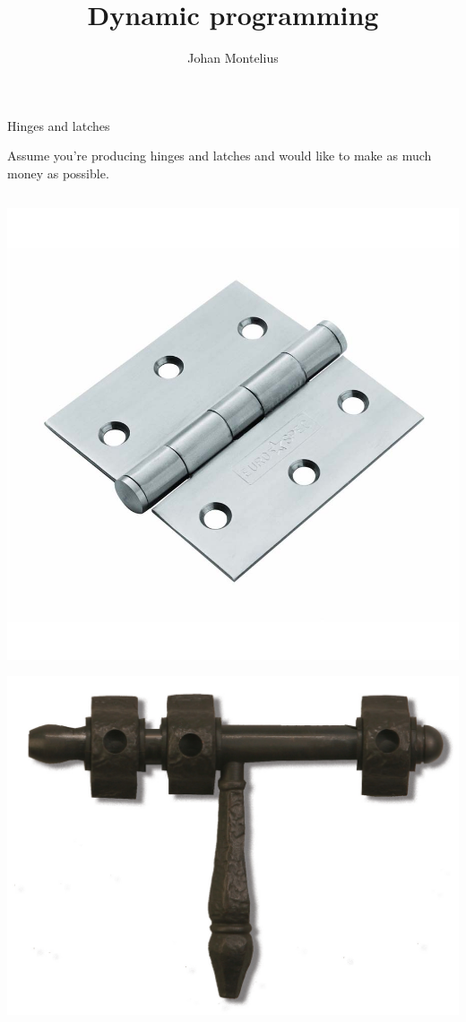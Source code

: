 

\title[ID1019 Dynamic programming]{Dynamic programming}


\author{Johan Montelius}
\date{\semester}



\begin{frame}
\titlepage
\end{frame}

\begin{frame}{Hinges and latches}

\pause Assume you're producing hinges and latches and would like to make as much money as possible.

\begin{columns}

 \begin{column}{0.4\linewidth}

\includegraphics[width=0.8\linewidth]{hinges.jpg}

\includegraphics[width=0.8\linewidth]{latch.jpg}


\end{column}
\end{columns}
\end{frame}
